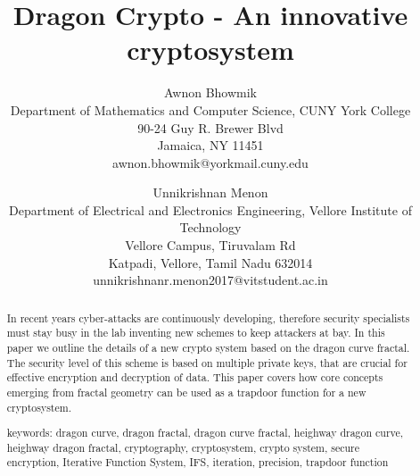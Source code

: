 \documentclass[a4paper,12pt]{article}
\begin{document}
\title{Dragon Crypto - An innovative cryptosystem} %

\author{ 
   \large Awnon Bhowmik \\[-3pt]
   \normalsize Department of Mathematics and Computer Science, CUNY York College  \\[-3pt]
    \normalsize 90-24 Guy R. Brewer Blvd \\[-3pt]
    \normalsize Jamaica, NY 11451 \\[-3pt]
    \normalsize	awnon.bhowmik@yorkmail.cuny.edu \\[-3pt]
  \and
   \large Unnikrishnan Menon \\[-3pt]
   \normalsize Department of Electrical and Electronics Engineering, Vellore Institute of Technology  \\[-3pt]
    \normalsize Vellore Campus, Tiruvalam Rd \\[-3pt]
    \normalsize Katpadi, Vellore,
Tamil Nadu 632014 \\[-3pt]
    \normalsize	unnikrishnanr.menon2017@vitstudent.ac.in \\[-3pt]
}


\maketitle



\begin{abstract} 
  In recent years cyber-attacks are continuously developing, therefore security specialists must stay busy in the lab inventing new schemes to keep attackers at bay. In this paper we outline the details of a new crypto system based on the dragon curve fractal. The security level of this scheme is based on multiple private keys, that are crucial for effective encryption and decryption of data. This paper covers how core concepts emerging from fractal geometry can be used as a trapdoor function for a new cryptosystem.
  
  \begin{flushleft}
  keywords: dragon curve, dragon fractal, dragon curve fractal, heighway dragon curve, heighway dragon fractal, cryptography, cryptosystem, crypto system, secure encryption, Iterative Function System, IFS, iteration, precision, trapdoor function
  \end{flushleft}
\end{abstract}
\end{document}
